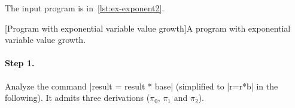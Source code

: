 \begin{example}\label{ex:expprog}
The input program is in~\autoref{lst:ex-exponent2}.

\begin{center}
\begin{minipage}{\textwidth}
[Program with exponential variable value growth]{A program with exponential variable value growth.}
\label{lst:ex-exponent2}
\end{minipage}
\end{center}

\paragraph*{Step 1.} Analyze the command \pr|result = result * base| (simplified to \pr|r=r*b| in the following).
It admits three derivations (\(\pi_0\), \(\pi_1\) and \(\pi_2\)).


\end{example}
